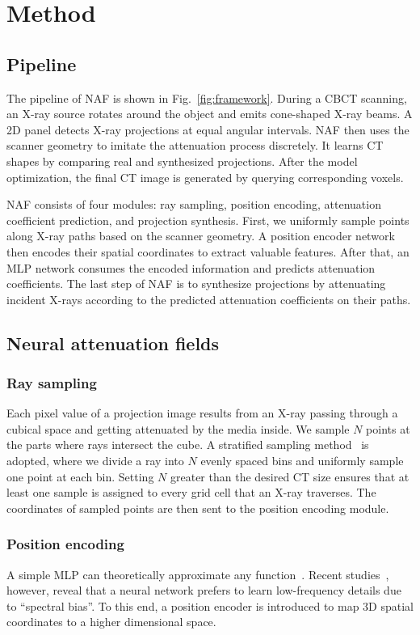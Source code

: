 \documentclass[runningheads]{llncs}
\begin{document}
\section{Method}
\subsection{Pipeline}
The pipeline of NAF is shown in Fig.~\ref{fig:framework}. During a CBCT scanning, an X-ray source rotates around the object and emits cone-shaped X-ray beams. A 2D panel detects X-ray projections at equal angular intervals. NAF then uses the scanner geometry to imitate the attenuation process discretely. It learns CT shapes by comparing real and synthesized projections. After the model optimization, the final CT image is generated by querying corresponding voxels.

NAF consists of four modules: ray sampling, position encoding, attenuation coefficient prediction, and projection synthesis. First, we uniformly sample points along X-ray paths based on the scanner geometry. A position encoder network then encodes their spatial coordinates to extract valuable features. After that, an MLP network consumes the encoded information and predicts attenuation coefficients. The last step of NAF is to synthesize projections by attenuating incident X-rays according to the predicted attenuation coefficients on their paths. 





\subsection{Neural attenuation fields}
\subsubsection{Ray sampling}
Each pixel value of a projection image results from an X-ray passing through a cubical space and getting attenuated by the media inside. We sample $N$ points at the parts where rays intersect the cube. A stratified sampling method~\cite{mildenhall2020nerf} is adopted, where we divide a ray into $N$ evenly spaced bins and uniformly sample one point at each bin. Setting $N$ greater than the desired CT size ensures that at least one sample is assigned to every grid cell that an X-ray traverses. The coordinates of sampled points are then sent to the position encoding module.

\subsubsection{Position encoding}
A simple MLP can theoretically approximate any function~\cite{hornik1989multilayer}. Recent studies~\cite{rahaman2019spectral,tancik2020fourier}, however, reveal that a neural network prefers to learn low-frequency details due to ``spectral bias''. To this end, a position encoder is introduced to map 3D spatial coordinates to a higher dimensional space.
\end{document}
